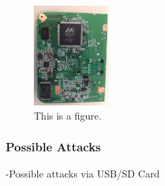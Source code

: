 \begin{figure}[htb]
\begin{center}
\includegraphics[width=0.25\textwidth]{safeplug_bottom}
\caption{This is a figure.}
\end{center}
\end{figure}

\subsubsection{Possible Attacks}
    -Possible attacks via USB/SD Card

